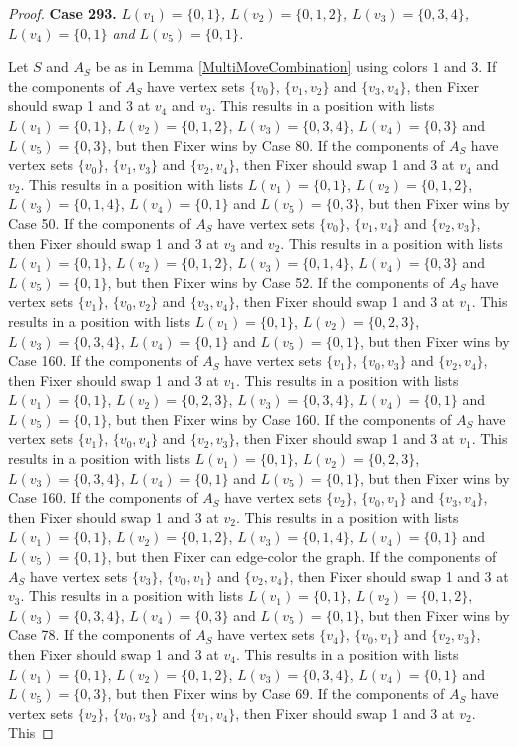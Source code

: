 \documentclass[12pt]{amsart}
\theoremstyle{plain}
\theoremstyle{definition}
\theoremstyle{remark}
\begin{document}
\begin{proof}
\noindent\textbf{Case 293.  }\textit{$L(v_1) = \{0, 1\}$, $L(v_2) = \{0, 1, 2\}$, $L(v_3) = \{0, 3, 4\}$, $L(v_4) = \{0, 1\}$ and $L(v_5) = \{0, 1\}$.}

Let $S$ and $A_S$ be as in Lemma \ref{MultiMoveCombination} using colors $1$ and $3$. If the components of $A_S$ have vertex sets $\{v_0\}$, $\{v_1, v_2\}$ and $\{v_3, v_4\}$, then Fixer should swap 1 and 3 at $v_4$ and $v_3$. This results in a position with lists $L(v_1) = \{0, 1\}$, $L(v_2) = \{0, 1, 2\}$, $L(v_3) = \{0, 3, 4\}$, $L(v_4) = \{0, 3\}$ and $L(v_5) = \{0, 3\}$, but then Fixer wins by Case 80. If the components of $A_S$ have vertex sets $\{v_0\}$, $\{v_1, v_3\}$ and $\{v_2, v_4\}$, then Fixer should swap 1 and 3 at $v_4$ and $v_2$. This results in a position with lists $L(v_1) = \{0, 1\}$, $L(v_2) = \{0, 1, 2\}$, $L(v_3) = \{0, 1, 4\}$, $L(v_4) = \{0, 1\}$ and $L(v_5) = \{0, 3\}$, but then Fixer wins by Case 50. If the components of $A_S$ have vertex sets $\{v_0\}$, $\{v_1, v_4\}$ and $\{v_2, v_3\}$, then Fixer should swap 1 and 3 at $v_3$ and $v_2$. This results in a position with lists $L(v_1) = \{0, 1\}$, $L(v_2) = \{0, 1, 2\}$, $L(v_3) = \{0, 1, 4\}$, $L(v_4) = \{0, 3\}$ and $L(v_5) = \{0, 1\}$, but then Fixer wins by Case 52. If the components of $A_S$ have vertex sets $\{v_1\}$, $\{v_0, v_2\}$ and $\{v_3, v_4\}$, then Fixer should swap 1 and 3 at $v_1$. This results in a position with lists $L(v_1) = \{0, 1\}$, $L(v_2) = \{0, 2, 3\}$, $L(v_3) = \{0, 3, 4\}$, $L(v_4) = \{0, 1\}$ and $L(v_5) = \{0, 1\}$, but then Fixer wins by Case 160. If the components of $A_S$ have vertex sets $\{v_1\}$, $\{v_0, v_3\}$ and $\{v_2, v_4\}$, then Fixer should swap 1 and 3 at $v_1$. This results in a position with lists $L(v_1) = \{0, 1\}$, $L(v_2) = \{0, 2, 3\}$, $L(v_3) = \{0, 3, 4\}$, $L(v_4) = \{0, 1\}$ and $L(v_5) = \{0, 1\}$, but then Fixer wins by Case 160. If the components of $A_S$ have vertex sets $\{v_1\}$, $\{v_0, v_4\}$ and $\{v_2, v_3\}$, then Fixer should swap 1 and 3 at $v_1$. This results in a position with lists $L(v_1) = \{0, 1\}$, $L(v_2) = \{0, 2, 3\}$, $L(v_3) = \{0, 3, 4\}$, $L(v_4) = \{0, 1\}$ and $L(v_5) = \{0, 1\}$, but then Fixer wins by Case 160. If the components of $A_S$ have vertex sets $\{v_2\}$, $\{v_0, v_1\}$ and $\{v_3, v_4\}$, then Fixer should swap 1 and 3 at $v_2$. This results in a position with lists $L(v_1) = \{0, 1\}$, $L(v_2) = \{0, 1, 2\}$, $L(v_3) = \{0, 1, 4\}$, $L(v_4) = \{0, 1\}$ and $L(v_5) = \{0, 1\}$, but then Fixer can edge-color the graph. If the components of $A_S$ have vertex sets $\{v_3\}$, $\{v_0, v_1\}$ and $\{v_2, v_4\}$, then Fixer should swap 1 and 3 at $v_3$. This results in a position with lists $L(v_1) = \{0, 1\}$, $L(v_2) = \{0, 1, 2\}$, $L(v_3) = \{0, 3, 4\}$, $L(v_4) = \{0, 3\}$ and $L(v_5) = \{0, 1\}$, but then Fixer wins by Case 78. If the components of $A_S$ have vertex sets $\{v_4\}$, $\{v_0, v_1\}$ and $\{v_2, v_3\}$, then Fixer should swap 1 and 3 at $v_4$. This results in a position with lists $L(v_1) = \{0, 1\}$, $L(v_2) = \{0, 1, 2\}$, $L(v_3) = \{0, 3, 4\}$, $L(v_4) = \{0, 1\}$ and $L(v_5) = \{0, 3\}$, but then Fixer wins by Case 69. If the components of $A_S$ have vertex sets $\{v_2\}$, $\{v_0, v_3\}$ and $\{v_1, v_4\}$, then Fixer should swap 1 and 3 at $v_2$. This 
\end{proof}
\end{document}
